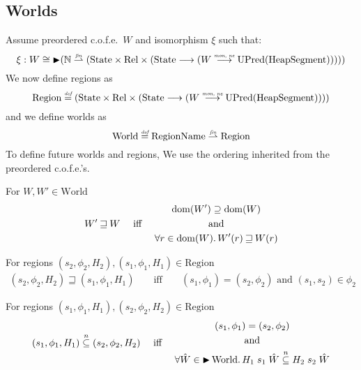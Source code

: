 \documentclass{article}
\newcommand{\finparfun}{\stackrel{\textit{\tiny{fin}}}{\rightharpoonup}}
\newcommand{\monnefun}{\stackrel{\textit{\tiny{mon, ne}}}{\longrightarrow}}
\newcommand{\fun}{\longrightarrow}
\newcommand{\defeq}{\stackrel{\textit{\tiny{def}}}{=}}
\newcommand{\nsubeq}[1][n]{\stackrel{\tiny{#1}}{\subseteq}}
\DeclareMathOperator{\dom}{dom}
\newcommand{\blater}{\mathop{\blacktriangleright}}
\newcommand{\cofe}{c.o.f.e.}
\newcommand{\cofes}{\cofe{}'s}
\newcommand{\future}{\mathbin{\sqsupseteq}}
\newcommand{\plaindom}[1]{\mathrm{#1}}
\newcommand{\HeapSegments}{\plaindom{HeapSegment}}
\newcommand{\nats}{\mathbb{N}}
\newcommand{\Rel}{\plaindom{Rel}}
\newcommand{\States}{\plaindom{State}}
\newcommand{\RegionNames}{\plaindom{RegionName}}
\newcommand{\Regions}{\plaindom{Region}}
\newcommand{\Worlds}{\plaindom{World}}
\newcommand{\UPred}[1]{\plaindom{UPred}(#1)}
\begin{document}
\subsection{Worlds}
Assume preordered \cofe{}\ $W$ and isomorphism $\xi$ such that:
\[
  \xi : W \cong \blater (\nats \finparfun (\States \times \Rel \times (\States \fun (W \monnefun \UPred{\HeapSegments}))))
\]
We now define regions as
\[
\Regions \defeq (\States \times \Rel \times (\States \fun (W \monnefun \UPred{\HeapSegments})))
\]
and we define worlds as
\[
\Worlds \defeq \RegionNames \finparfun \Regions
\]
To define future worlds and regions, We use the ordering inherited from the preordered \cofes{}.
\begin{definition}
  For $W, W' \in \Worlds$
 \begin{align*}
 W' \future W & & \text{ iff } & &
   \begin{gathered}
     \dom(W') \supseteq \dom(W)\\ 
     \text{ and } \\
     \forall r \in \dom(W) \ldotp W'(r) \future W(r)
   \end{gathered}
 \end{align*}
\end{definition}

\begin{definition}
For regions $(s_2,\phi_2,H_2), (s_1,\phi_1,H_1) \in \Regions$
  \begin{align*}
 (s_2,\phi_2,H_2) \future (s_1,\phi_1,H_1) &&\text{ iff } & &
(s_1,\phi_1) = (s_2,\phi_2) \text{ and } (s_1,s_2) \in \phi_2
  \end{align*}
\end{definition}

\begin{definition}
For regions $(s_1,\phi_1,H_1), (s_2,\phi_2,H_2) \in \Regions$
\begin{align*}
  (s_1,\phi_1,H_1) \nsubeq (s_2,\phi_2,H_2) & & \text{ iff } & &
  \begin{gathered}
    (s_1,\phi_1) = (s_2,\phi_2)\\
    \text{ and }\\
    \forall \hat{W} \in \blater \Worlds \ldotp H_1 \; s_1 \; \hat{W} \nsubeq H_2 \; s_2 \; \hat{W}
  \end{gathered}
\end{align*}
\end{definition}
\end{document}
